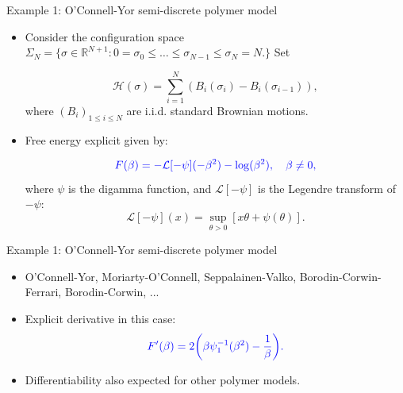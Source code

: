 \documentclass[handout]{beamer}
\begin{document}
\begin{frame}{Example 1: O'Connell-Yor semi-discrete polymer model}
	
	\pause
\begin{itemize}
	\item Consider the configuration space $\Sigma_{N}= \{ \sigma \in \mathbb R^{N+1} : 0 = \sigma_{0} \leq \ldots \leq \sigma_{N-1} \leq \sigma_{N} = N.\}$ Set 
	
$$ \mathcal H(\sigma) = \sum_{i=1}^{N} (B_{i}(\sigma_{i}) - B_{i}(\sigma_{i-1})),$$ 
where $(B_{i})_{1\leq i \leq N}$ are i.i.d. standard Brownian motions.	 
	\vspace{0.1cm}
	\item Free energy explicit given by:
	
	$$\begin{color}{blue}F(\beta)=
- \mathcal L [-\psi](-\beta^{2})-\log(\beta^{2}), \quad \beta\neq 0, \end{color}$$ 
where $\psi$ is the digamma function, and $\mathcal L[-\psi]$ is the Legendre transform of $-\psi$:
$$\mathcal L[-\psi] (x) = \sup_{\theta>0} [x\theta + \psi(\theta)].$$ 
	\end{itemize}
		
\end{frame}

\begin{frame}{Example 1: O'Connell-Yor semi-discrete polymer model}

\begin{itemize}
\item O'Connell-Yor, Moriarty-O'Connell, Seppalainen-Valko, Borodin-Corwin-Ferrari, Borodin-Corwin, ... 
\item Explicit derivative in this case: 
	\begin{align*}
	\begin{color}{blue}F'(\beta)=2 \bigg(\beta \psi_{1}^{-1}(\beta^{2}) - \frac{1}{\beta}\bigg). \end{color}
 	\end{align*}
\item Differentiability also expected  for other polymer models.
\end{itemize}

\end{frame}
\end{document}

